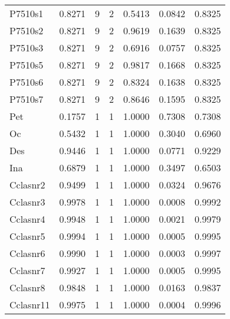 \begin{table}[H]
\begin{tabular}{lrrrrrr}
P7510s1 & 0.8271 & 9 & 2 & 0.5413 & 0.0842 & 0.8325 \\
P7510s2 & 0.8271 & 9 & 2 & 0.9619 & 0.1639 & 0.8325 \\
P7510s3 & 0.8271 & 9 & 2 & 0.6916 & 0.0757 & 0.8325 \\
P7510s5 & 0.8271 & 9 & 2 & 0.9817 & 0.1668 & 0.8325 \\
P7510s6 & 0.8271 & 9 & 2 & 0.8324 & 0.1638 & 0.8325 \\
P7510s7 & 0.8271 & 9 & 2 & 0.8646 & 0.1595 & 0.8325 \\
Pet & 0.1757 & 1 & 1 & 1.0000 & 0.7308 & 0.7308 \\
Oc & 0.5432 & 1 & 1 & 1.0000 & 0.3040 & 0.6960 \\
Des & 0.9446 & 1 & 1 & 1.0000 & 0.0771 & 0.9229 \\
Ina & 0.6879 & 1 & 1 & 1.0000 & 0.3497 & 0.6503 \\
Cclasnr2 & 0.9499 & 1 & 1 & 1.0000 & 0.0324 & 0.9676 \\
Cclasnr3 & 0.9978 & 1 & 1 & 1.0000 & 0.0008 & 0.9992 \\
Cclasnr4 & 0.9948 & 1 & 1 & 1.0000 & 0.0021 & 0.9979 \\
Cclasnr5 & 0.9994 & 1 & 1 & 1.0000 & 0.0005 & 0.9995 \\
Cclasnr6 & 0.9990 & 1 & 1 & 1.0000 & 0.0003 & 0.9997 \\
Cclasnr7 & 0.9927 & 1 & 1 & 1.0000 & 0.0005 & 0.9995 \\
Cclasnr8 & 0.9848 & 1 & 1 & 1.0000 & 0.0163 & 0.9837 \\
Cclasnr11 & 0.9975 & 1 & 1 & 1.0000 & 0.0004 & 0.9996 \\
\bottomrule
\end{tabular}
\end{table}